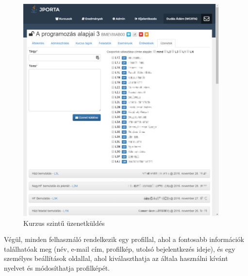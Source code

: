 \begin{figure}[h]
    \centering
    \includegraphics[width=0.95\textwidth]{figures/Jporta-course-messages}
    \caption{Kurzus szintű üzenetküldés}
    \label{figure:jporta-course-messages}
\end{figure}

Végül, minden felhasználó rendelkezik egy profillal, ahol a fontosabb információk találhatóak meg (név, e-mail cím, profilkép, utolsó bejelentkezés ideje), és egy személyes beállítások oldallal, ahol kiválaszthatja az általa használni kívánt nyelvet és módosíthatja profilképét.